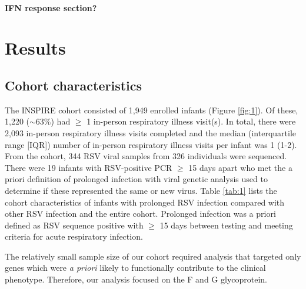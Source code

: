 \documentclass{article} %
\begin{document}
\paragraph{IFN response section?}

\section{Results}
\subsection{Cohort characteristics}
The INSPIRE cohort consisted of 1,949 enrolled infants 
(Figure \ref{fig:1}).
Of these, 1,220 ($\sim 63\%$) had $\ge$ 1 in-person respiratory illness visit(s). 
In total, there were 2,093 in-person respiratory illness visits completed and the median (interquartile range [IQR]) number of in-person respiratory illness visits per infant was 1 (1-2).
From the cohort, 344 RSV viral samples from 326 individuals were sequenced.
There were 19 infants with RSV-positive PCR $\ge$ 15 days apart who met the a priori definition of prolonged infection with viral genetic analysis used to determine if these represented the same or new virus.
Table \ref{tab:1} lists the cohort characteristics of infants with prolonged RSV infection compared with other RSV infection and the entire cohort. 
Prolonged infection was a priori defined as RSV sequence positive with $\ge$ 15 days between testing and meeting criteria for acute respiratory infection.

The relatively small sample size of our cohort required analysis that targeted only genes which were \textit{a priori} likely to functionally contribute to the clinical phenotype. 
Therefore, our analysis focused on the F and G glycoprotein. 
\end{document}
